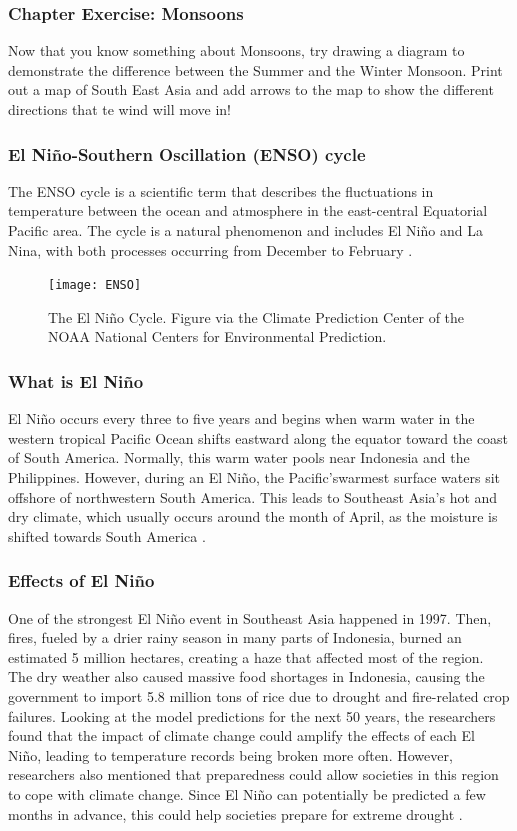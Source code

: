 \subsubsection{Chapter Exercise: Monsoons}
Now that you know something about Monsoons, try drawing a diagram to demonstrate the difference between the Summer and the Winter Monsoon. Print out a map of South East Asia and add arrows to the map to show the different directions that te wind will move in!

\subsubsection{El Ni\~no-Southern Oscillation (ENSO) cycle}

The ENSO cycle is a scientific term that describes the fluctuations in temperature between the ocean and atmosphere in the east-central Equatorial Pacific area. The cycle is a natural phenomenon and includes El Ni\~no and La Nina, with both processes occurring from December to February \citep{enso}. 

\begin{figure}[h!]
  \texttt{[image: ENSO]}
  \caption{The El Ni\~{n}o Cycle. Figure via the Climate Prediction Center of the NOAA National Centers for Environmental Prediction.}
  \label{fig:ENSO}
\end{figure}

\subsubsection{What is El Ni\~no}
El Ni\~no occurs every three to five years and begins when warm water in the western tropical Pacific Ocean shifts eastward along the equator toward the coast of South America. Normally, this warm water pools near Indonesia and the Philippines. However, during an El Ni\~no, the Pacific'swarmest surface waters sit offshore of northwestern South America. This leads to Southeast Asia's hot and dry climate, which usually occurs around the month of April, as the moisture is shifted towards South America \citep{enso}. 

\subsubsection{Effects of El Ni\~no}

One of the strongest El Ni\~no event in Southeast Asia happened in 1997. Then, fires, fueled by a drier rainy season in many parts of Indonesia, burned an estimated 5 million hectares, creating a haze that affected most of the region. The dry weather also caused massive food shortages in Indonesia, causing the government to import 5.8 million tons of rice due to drought and fire-related crop failures. Looking at the model predictions for the next 50 years, the researchers found that the impact of climate change could amplify the effects of each El Ni\~no, leading to temperature records being broken more often. However, researchers also mentioned that preparedness could allow societies in this region to cope with climate change. Since El Ni\~no can potentially be predicted a few months in advance, this could help societies prepare for extreme drought \citep{elninoindo}. 

